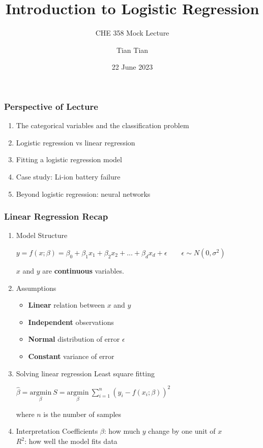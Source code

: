 \documentclass[10pt,aspectratio=169]{beamer}
\title{\Large \bfseries Introduction to Logistic Regression}
\subtitle{\large CHE 358 Mock Lecture}
\author{\large Tian Tian}
\date{\large 22 June 2023}
\begin{document}
 {  \frame{\titlepage} }


\begin{frame}[c]
  \frametitle{Perspective of Lecture}
  \begin{enumerate}
    \vfill \item The categorical variables and the classification problem %
    \vfill \item Logistic regression vs linear regression %
    \vfill \item Fitting a logistic regression model %
    \vfill \item Case study: Li-ion battery failure %
    \vfill \item Beyond logistic regression: neural networks %
  \end{enumerate}
\end{frame}


\begin{frame}
  \frametitle{Linear Regression Recap}
  \begin{enumerate}
  \item Model Structure

    \vfill
    $y = f(x; \beta) = β_{0} + β_{1} x_{1} + β_{2} x_{2} + ... + β_{d}
    x_{d} + \epsilon \quad\quad \epsilon \sim N(0, \sigma^{2})$

    $x$ and $y$ are \textbf{continuous} variables.
    
    \vfill \item Assumptions

    \vfill
    \begin{itemize}
    \item \textbf{Linear} relation between $x$ and $y$
    \item \textbf{Independent} observations
    \item \textbf{Normal} distribution of error $\epsilon$
    \item \textbf{Constant} variance of error
    \end{itemize}


 
    \vfill \item Solving linear regression \vfill Least square fitting
    
    ${\displaystyle \hat{\beta} = \underset{\beta}{\mathrm{argmin}}\ S =
      \underset{\beta}{\mathrm{argmin}}\ \sum_{i=1}^{n} (y_{i} -
      f(x_{i}; \beta))^{2}}$

    where $n$ is the number of samples
    
    \vfill \item Interpretation \vfill
    Coefficients $\beta$: how much $y$ change by one unit of $x$\\
    $R^{2}$: how well the model fits data
    
    
  \end{enumerate}

\end{frame}
\end{document}
